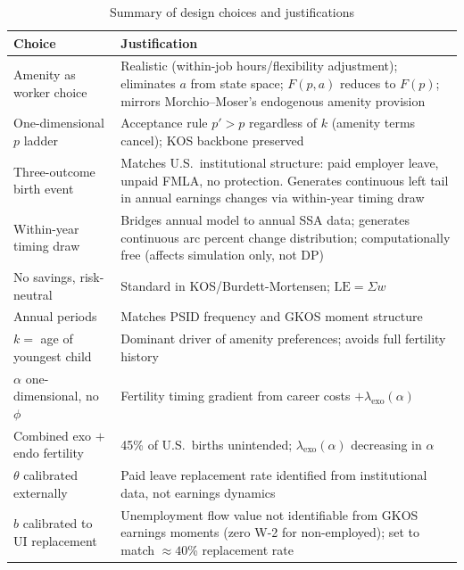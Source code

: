 \documentclass[11pt]{article}
\newcommand{\LE}{\mathrm{LE}}
\begin{document}
\begin{table}[h]\centering\small
\caption{Summary of design choices and justifications}
\begin{tabular}{p{4.8cm}p{9cm}}
\toprule
Choice & Justification \\
\midrule
Amenity as worker choice & Realistic (within-job hours/flexibility adjustment); eliminates $a$ from state space; $F(p,a)$ reduces to $F(p)$; mirrors Morchio--Moser's endogenous amenity provision \\
One-dimensional $p$ ladder & Acceptance rule $p' > p$ regardless of $k$ (amenity terms cancel); KOS backbone preserved \\
Three-outcome birth event & Matches U.S.\ institutional structure: paid employer leave, unpaid FMLA, no protection. Generates continuous left tail in annual earnings changes via within-year timing draw \\
Within-year timing draw & Bridges annual model to annual SSA data; generates continuous arc percent change distribution; computationally free (affects simulation only, not DP) \\
No savings, risk-neutral & Standard in KOS/Burdett-Mortensen; $\LE = \Sigma w$ \\
Annual periods & Matches PSID frequency and GKOS moment structure \\
$k =$ age of youngest child & Dominant driver of amenity preferences; avoids full fertility history \\
$\alpha$ one-dimensional, no $\phi$ & Fertility timing gradient from career costs $+ \lambda_{\text{exo}}(\alpha)$ \\
Combined exo $+$ endo fertility & 45\% of U.S.\ births unintended; $\lambda_{\text{exo}}(\alpha)$ decreasing in $\alpha$ \\
$\theta$ calibrated externally & Paid leave replacement rate identified from institutional data, not earnings dynamics \\
$b$ calibrated to UI replacement & Unemployment flow value not identifiable from GKOS earnings moments (zero W-2 for non-employed); set to match $\approx 40$\% replacement rate \\
\bottomrule
\end{tabular}
\end{table}
\end{document}
